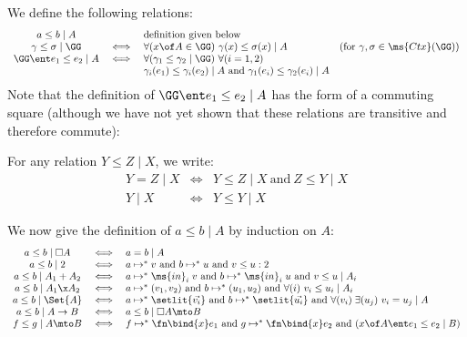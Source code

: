 \documentclass{article}
\newcommand{\step}{\mapsto}
\newcommand{\steps}{\step^*}
\newcommand{\lr}[2]{#2\mathrel{|}#1}
\newcommand{\lrcx}[3]{#1 \ent \lr{#2}{#3}}
\renewcommand{\land}{~\text{and}~}
\newcommand{\disc}[1]{\square{#1}}
\begin{document}
We define the following relations:
\[\begin{array}{ccll}
    \lr{A}{a \le b}  && \text{definition given below}\\
    \lr{\GG}{\gamma \le \sigma}
    &\iff& \forall(x\of A \in \GG)\ \lr{A}{\gamma(x) \le \sigma(x)}
    & (\text{for}~\gamma,\sigma \in \ms{Ctx}(\GG))\\
    \lrcx{\GG}{A}{e_1 \le e_2}
    &\iff& \forall(%
    \lr{\GG}{\gamma_1 \le \gamma_2})
    \ \forall(i = 1,2)\\
    &&
    \lr{A}{\gamma_i(e_1) \le \gamma_i(e_2)} \land \lr{A}{\gamma_1(e_i) \le \gamma_2(e_i)}
\end{array}\]
Note that the definition of $\lrcx{\GG}{A}{e_1 \le e_2}$ has the form of a
commuting square (although we have not yet shown that these relations are
transitive and therefore commute): 

For any relation $\lr{X}{Y \le Z}$, we write:
\[\begin{array}{ccl}
  \lr{X}{Y = Z} &\iff& \lr{X}{Y \le Z} \land \lr{X}{Z \le Y}\\
  \lr{X}{Y}     &\iff& \lr{X}{Y \le Y}
\end{array}\]

We now give the definition of $\lr{A}{a \le b}$ by induction on $A$:
\[\begin{array}{ccl}
  \lr{\disc{A}}{a \le b} &\iff& \lr{A}{a = b}\\
  \lr{2}{a \le b} &\iff&
  a \steps v \land b \steps u \land v \le u : 2\\
  \lr{A_1 + A_2}{a \le b} &\iff&
  a \steps \ms{in}_i\;v \land b \steps \ms{in}_i\;u \land \lr{A_i}{v \le u}\\
  \lr{A_1 \x A_2}{a \le b} &\iff&
  a \steps (v_1, v_2) \land b \steps (u_1, u_2) \land \forall(i)\ \lr{A_i}{v_i \le u_i}\\
  \lr{\Set{A}}{a \le b} &\iff&
  a \steps \setlit{\vec{v_i}} \land b \steps \setlit{\vec{u_i}}
  \land \forall(v_i)\;\exists(u_j)\ \lr{A}{v_i = u_j}\\
  \lr{A \to B}{a \le b} &\iff& \lr{\disc{A} \mto B}{a \le b}\\
  \lr{A \mto B}{f \le g} &\iff&
  f \steps \fn\bind{x} e_1 \land g \steps \fn\bind{x} e_2
  \land (\lrcx{x\of A}{B}{e_1 \le e_2})
\end{array}\]
\end{document}
